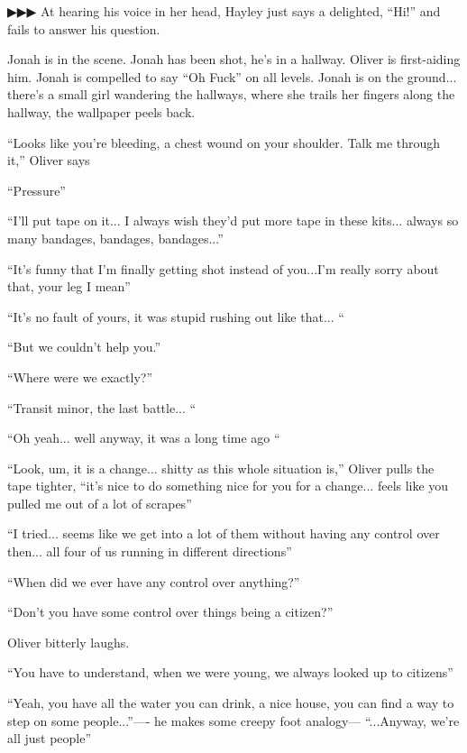  {\color[RGB]{68,68,68}▶▶▶ } At hearing his voice in her head, Hayley just says a delighted, ``Hi!'' and fails to answer his question.






Jonah is in the scene.  Jonah has been shot, he's in a hallway.  Oliver is first-aiding him. Jonah is compelled to say ``Oh Fuck'' on all levels.  Jonah is on the ground... there's a small girl wandering the hallways, where she trails her fingers along the hallway, the wallpaper peels back. 

``Looks like you're bleeding, a chest wound on your shoulder.  Talk me through it,'' Oliver says

``Pressure''

``I'll put tape on it... I always wish they'd put more tape in these kits... always so many bandages, bandages, bandages...''

``It's funny that I'm finally getting shot instead of you...I'm really sorry about that, your leg I mean''

``It's no fault of yours, it was stupid rushing out like that... ``

``But we couldn't help you.''

``Where were we exactly?''

``Transit minor, the last battle...  ``

``Oh yeah... well anyway, it was a long time ago ``

``Look, um, it is a change... shitty as this whole situation is,'' Oliver pulls the tape tighter, ``it's nice to do something nice for you for a change... feels like you pulled me out of a lot of scrapes''

``I tried... seems like we get into a lot of them without having any control over then... all four of us running in different directions''

``When did we ever have any control over anything?''

``Don't you have some control over things being a citizen?''

Oliver bitterly laughs. 

``You have to understand, when we were young, we always looked up to citizens''

``Yeah, you have all the water you can drink, a nice house, you can find a way to step on some people...''---- he makes some creepy foot analogy--- ``...Anyway, we're all just people''

